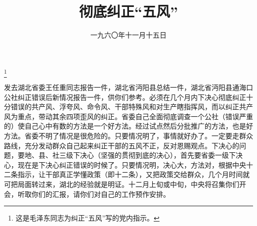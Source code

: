 
\title{彻底纠正“五风”}
\date{一九六〇年十一月十五日}
\thanks{这是毛泽东同志为纠正“五风”写的党内指示。}
\maketitle



发去湖北省委王任重同志报告一件，湖北省沔阳县总结一件，湖北省沔阳县通海口公社纠正错误后新情况报告一件，供你们参考。必须在几个月内下决心彻底纠正十分错误的共产风、浮夸风、命令风、干部特殊风和对生产瞎指挥风，而以纠正共产风为重点，带动其余四项歪风的纠正。省委自己全面彻底调查一个公社（错误严重的）使自己心中有数的方法是一个好方法。经过试点然后分批推广的方法，也是好方法。省委不明了情况是很危险的。只要情况明了，事情就好办了。一定要走群众路线，充分发动群众自己起来纠正干部的五风不正，反对恩赐观点。下决心的问题，要地、县、社三级下决心（坚强的贯彻到底的决心），首先要省委一级下决心，现在是下决心纠正错误的时候了。只要情况明，决心大，方法对，根据中央十二条指示，让干部真正学懂政策（即十二条），又把政策交给群众，几个月时间就可把局面转过来，湖北的经验就是明证。十二月上旬或中旬，中央将召集你们开会，听取你们的汇报，请你们对自己的工作预作安排。


